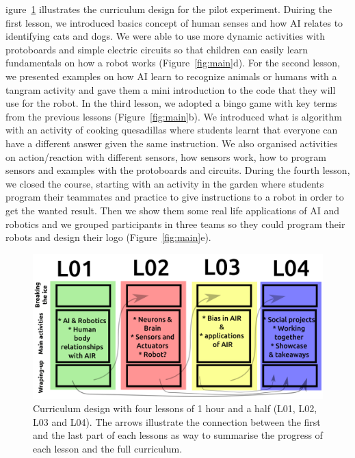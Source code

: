 \documentclass[sigconf,anonymous,review]{acmart}
\begin{document}
igure~\ref{fig:curriculum} illustrates the curriculum design for the pilot experiment. 
Duiring the first lesson, we introduced basics concept of human senses and how AI relates to identifying cats and dogs. We were able to use more dynamic activities with protoboards and simple electric circuits so that children can easily learn fundamentals on how a robot works (Figure~\ref{fig:main}d). 
For the second lesson, we presented examples on how AI learn to recognize animals or humans with a tangram activity and gave them a mini introduction to the code that they will use for the robot.
In the third lesson, we adopted a bingo game with key terms from the previous lessons (Figure~\ref{fig:main}b). We 
introduced what is algorithm with an activity of cooking quesadillas where students learnt that everyone can have a different answer given the same instruction.
We also organised activities on action/reaction with different sensors, how sensors work, how to program sensors and examples with the protoboards and circuits.
During the fourth lesson, we closed the course, starting with an activity in the garden where students program their teammates and practice to give instructions to a robot in order to get the wanted result. Then we show them some real life applications of AI and robotics and we grouped participants in three teams so they could program their robots and design their logo (Figure~\ref{fig:main}e). 
\begin{figure}[h]
  \centering
    \includegraphics[width=\linewidth]{../figures/curriculum/outputs/drawing-v01.png}  %
    \caption{
    Curriculum design with four lessons of 1 hour and a half 
 (L01, L02, L03 and L04).
    The arrows illustrate the connection between the first and the last part of each lessons as way to summarise the progress of each lesson and the full curriculum.
    }
    \label{fig:curriculum}
\end{figure}
\end{document}
